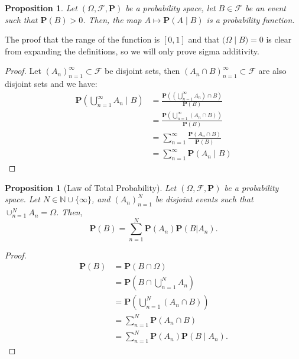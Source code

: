 \documentclass[11pt,a4paper]{article}
\theoremstyle{definition}
\theoremstyle{plain}
\newtheorem{proposition}[theorem]{Proposition}
\newcommand{\N}{\mathbb{N}}
\begin{document}
  \begin{proposition}
    Let $(\Omega, \mathcal F, \mathbf P)$ be a probability space, let 
    $B \in \mathcal F$ be an event such that $\mathbf P(B) > 0$. Then,
    the map $A \mapsto \mathbf P(A \mid B)$ is a probability function.
  \end{proposition}
  The proof that the range of the function is $[0,1]$ and that 
  $\mathbf (\Omega \mid B) = 0$ is clear from expanding the definitions,
  so we will only prove sigma additivity.
  \begin{proof}
    Let $(A_n)_{n=1}^{\infty} \subset \mathcal F$ be disjoint sets, then
    $(A_n \cap B)_{n=1}^{\infty} \subset \mathcal F$ are also disjoint sets
    and we have:
      \begin{align*}
        \mathbf{P}\left( \bigcup_{n=1}^{\infty} A_n \mid B \right) 
        & = \frac{\mathbf{P}\left( \left( \bigcup_{n=1}^{\infty} A_n \right) \cap B \right)}{\mathbf{P}(B)} \\
        & = \frac{\mathbf{P}\left( \bigcup_{n=1}^{\infty} (A_n \cap B) \right)}{\mathbf{P}(B)} \\
        & = \sum_{n=1}^{\infty} \frac{\mathbf{P}(A_n \cap B)}{\mathbf{P}(B)} \\
        & = \sum_{n=1}^{\infty} \mathbf{P}(A_n \mid B)
      \end{align*}
  \end{proof}

  \begin{proposition}[Law of Total Probability]
    Let $(\Omega, \mathcal F, \mathbf P)$ be a probability space.
    Let $N \in \N \cup \{\infty\}$, and $(A_n)_{n=1}^{N}$ be disjoint events
    such that $\cup_{n=1}^{N} A_n = \Omega$. Then,
    \[
      \mathbf{P}(B)=\sum_{n=1}^{N}\mathbf{P}(A_{n})\mathbf{P}(B|A_{n}).
    \]
  \end{proposition}
  \begin{proof}
    \begin{align*}
      \mathbf{P}(B) &= 
      \mathbf{P}(B \cap \Omega) \\ &= 
      \mathbf{P}\left( B \cap \bigcup_{n=1}^{N} A_n \right) \\ &= 
      \mathbf{P}\left( \bigcup_{n=1}^{N} (A_n \cap B) \right) \\ &= 
      \sum_{n=1}^{N} \mathbf{P}(A_n \cap B) \\ &= 
      \sum_{n=1}^{N} \mathbf{P}(A_n) \mathbf{P}(B \mid A_n).
      \end{align*}
  \end{proof}
\end{document}
